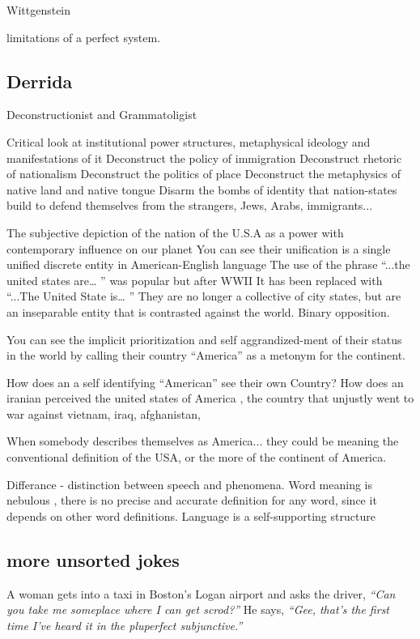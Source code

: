 Wittgenstein

limitations of a perfect system.

\subsection{Derrida}
Deconstructionist and Grammatoligist

Critical look at institutional power structures, metaphysical ideology and manifestations of it
Deconstruct the policy of immigration
Deconstruct rhetoric of nationalism
Deconstruct the politics of place
Deconstruct the metaphysics of native land and native tongue
Disarm the bombs of identity that nation-states build to defend themselves from the strangers, Jews, Arabs, immigrants...

The subjective depiction of the nation of the U.S.A as a power with contemporary influence on our planet
You can see their unification is a single unified discrete entity in American-English language
The use of the phrase “...the united states are… ” was popular but after WWII
It has been replaced with “...The United State is… ”
They are no longer a collective of city states, but are an inseparable entity that is contrasted against the world. Binary opposition. 

You can see the implicit prioritization and self aggrandized-ment of their status in the world by calling their country “America” as a metonym for the continent.

How does an a self identifying “American” see their own Country?
How does an iranian perceived the united states of America
, the country that unjustly went to war against vietnam, iraq, afghanistan, 

When somebody describes themselves as America... they could be meaning the conventional definition of the USA, or the more of the continent of America.

Differance - distinction between speech and phenomena. Word meaning is nebulous , there is no precise and accurate definition for any word, since it depends on other word definitions.
Language is a self-supporting structure

\subsection{more unsorted jokes}

A woman gets into a taxi in Boston’s Logan airport and asks the driver, \textit{``Can you take me someplace where I can get scrod?''} He says, \textit{``Gee, that’s the first time I’ve heard it in the pluperfect subjunctive.''}


